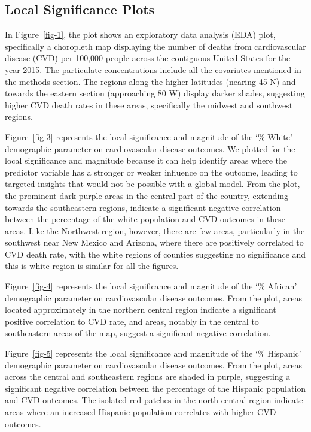 \documentclass[
]{article}
\begin{document}
\subsection{Local Significance Plots}\label{local-significance-plots}

In Figure~\ref{fig-1}, the plot shows an exploratory data analysis (EDA)
plot, specifically a choropleth map displaying the number of deaths from
cardiovascular disease (CVD) per 100,000 people across the contiguous
United States for the year 2015. The particulate concentrations include
all the covariates mentioned in the methods section. The regions along
the higher latitudes (nearing 45 N) and towards the eastern section
(approaching 80 W) display darker shades, suggesting higher CVD death
rates in these areas, specifically the midwest and southwest regions.~

Figure~\ref{fig-3} represents the local significance and magnitude of
the `\% White' demographic parameter on cardiovascular disease outcomes.
We plotted for the local significance and magnitude because it can help
identify areas where the predictor variable has a stronger or weaker
influence on the outcome, leading to targeted insights that would not be
possible with a global model. From the plot, the prominent dark purple
areas in the central part of the country, extending towards the
southeastern regions, indicate a significant negative correlation
between the percentage of the white population and CVD outcomes in these
areas. Like the Northwest region, however, there are few areas,
particularly in the southwest near New Mexico and Arizona, where there
are positively correlated to CVD death rate, with the white regions of
counties suggesting no significance and this is white region is similar
for all the figures.

Figure~\ref{fig-4} represents the local significance and magnitude of
the `\% African' demographic parameter on cardiovascular disease
outcomes. From the plot, areas located approximately in the northern
central region indicate a significant positive correlation to CVD rate,
and areas, notably in the central to southeastern areas of the map,
suggest a significant negative correlation.

Figure~\ref{fig-5} represents the local significance and magnitude of
the `\% Hispanic' demographic parameter on cardiovascular disease
outcomes. From the plot, areas across the central and southeastern
regions are shaded in purple, suggesting a significant negative
correlation between the percentage of the Hispanic population and CVD
outcomes. The isolated red patches in the north-central region indicate
areas where an increased Hispanic population correlates with higher CVD
outcomes.~
\end{document}
